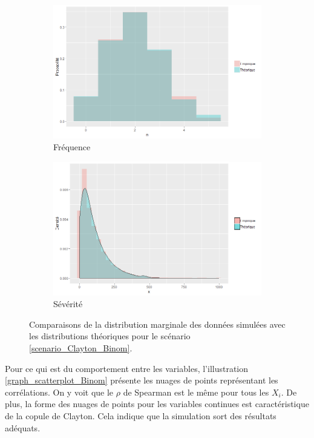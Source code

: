 \documentclass{article}
\begin{document}
	
		\begin{figure}[H]
		\begin{subfigure}[l]{0.5\textwidth}
			\includegraphics[width=\textwidth]{Graph/Clayton_Binom_N.png}
			\caption{Fréquence}
		\end{subfigure}
		\begin{subfigure}[r]{0.5\textwidth}
			\includegraphics[width=\textwidth]{Graph/Clayton_Binom_X.png}
			\caption{Sévérité}
		\end{subfigure}
		\caption{Comparaisons de la distribution marginale des données simulées avec les distributions théoriques pour le scénario \ref{scenario_Clayton_Binom}.}
		\label{graph_densite_Binom}
		\end{figure}
		
		Pour ce qui est du comportement entre les variables, l'illustration \ref{graph_scatterplot_Binom} présente les nuages de points représentant les corrélations. On y voit que le $\rho$ de Spearman est le même pour tous les $X_i$. De plus, la forme des nuages de points pour les variables continues est caractéristique de la copule de Clayton. Cela indique que la simulation sort des résultats adéquats.\\
		
\end{document}
